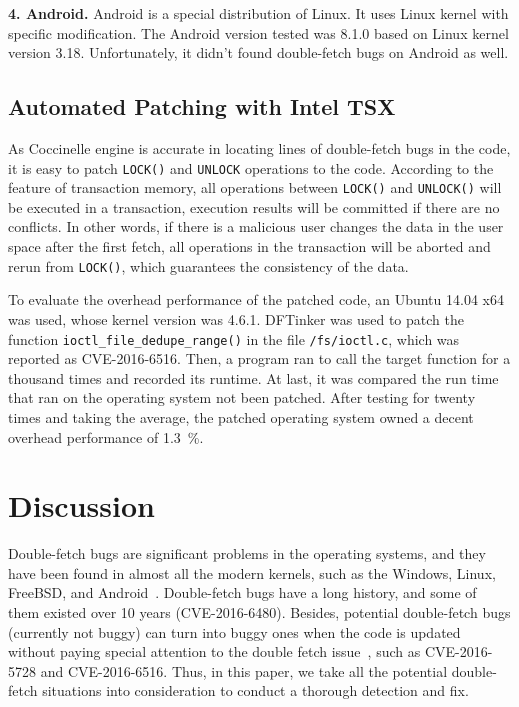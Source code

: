 \documentclass[10pt]{llncs}
\begin{document}
\textbf{4. Android.}
Android is a special distribution of Linux. It uses Linux kernel with specific modification. The Android version tested was 8.1.0 based on Linux kernel version 3.18. Unfortunately, it didn't found double-fetch bugs on Android as well.

\subsection{Automated Patching with Intel TSX}
\label{evalue2}

As Coccinelle engine is accurate in locating lines of double-fetch bugs in the code, it is easy to patch \verb:LOCK(): and \verb:UNLOCK: operations to the code. According to the feature of transaction memory, all operations between \verb:LOCK(): and \verb:UNLOCK(): will be executed in a transaction, execution results will be committed if there are no conflicts. In other words, if there is a malicious user changes the data in the user space after the first fetch, all operations in the transaction will be aborted and rerun from \verb:LOCK():, which guarantees the consistency of the data.

To evaluate the overhead performance of the patched code, an Ubuntu 14.04 x64 was used, whose kernel version was 4.6.1. DFTinker was used to patch the function \verb:ioctl_file_dedupe_range(): in the file \verb:/fs/ioctl.c:, which was reported as CVE-2016-6516. Then, a program ran to call the target function for a thousand times and recorded its runtime. At last, it was compared the run time that ran on the operating system not been patched. After testing for twenty times and taking the average, the patched operating system owned a decent overhead performance of 1.3~\%.

\section{Discussion}%
\label{discuss}

Double-fetch bugs are significant problems in the operating systems, and they have been found in almost all the modern kernels, such as the Windows, Linux, FreeBSD, and Android~\cite{wang}. Double-fetch bugs have a long history, and some of them existed over 10 years (CVE-2016-6480). Besides, potential double-fetch bugs (currently not buggy) can turn into buggy ones when the code is updated without paying special attention to the double fetch issue~\cite{wang}, such as CVE-2016-5728 and CVE-2016-6516. Thus, in this paper, we take all the potential double-fetch situations into consideration to conduct a thorough detection and fix.
\end{document}
